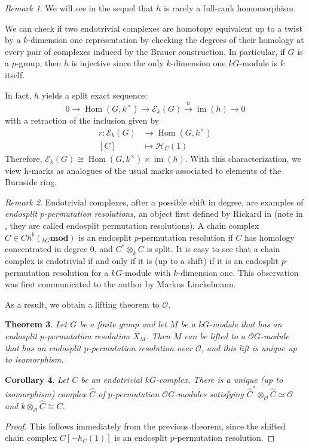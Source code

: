 \documentclass[10pt,letterpaper, boxed, cm]{amsart}
\newcommand{\Hom}{\operatorname{Hom}}
\newcommand{\bigO}{\mathcal{O}}
\newcommand{\calE}{\mathcal{E}}
\newcommand{\calH}{\mathcal{H}}
\newcommand{\calO}{\mathcal{O}}
\newtheorem{theorem}{Theorem}[section]
\newtheorem{corollary}[theorem]{Corollary}
\theoremstyle{remark}
\newtheorem{remark}[theorem]{Remark}
\theoremstyle{definition}
\begin{document}
	\begin{remark}
		We will see in the sequel that $h$ is rarely a full-rank homomorphism.

		We can check if two endotrivial complexes are homotopy equivalent up to a twist by a $k$-dimension one representation by checking the degrees of their homology at every pair of complexes induced by the Brauer construction. In particular, if $G$ is a $p$-group, then $h$ is injective since the only $k$-dimension one $kG$-module is $k$ itself.

		In fact, $h$ yields a split exact sequence:
		\[0 \to \Hom(G, k^\times) \to \calE_k(G) \xrightarrow{h} \operatorname{im}(h) \to 0\] with a retraction of the inclusion given by
		\begin{align*}
		r: \calE_k(G) & \to \Hom(G, k^\times)\\
		[C] &\mapsto \calH_C(1)
		\end{align*}
		Therefore, $\calE_k(G) \cong  \Hom(G, k^\times) \times \operatorname{im}(h)$. With this characterization, we view h-marks as analogues of the usual marks associated to elements of the Burnside ring.
	\end{remark}

    \begin{remark}
        Endotrivial complexes, after a possible shift in degree, are examples of \textit{endosplit $p$-permutation resolutions,} an object first defined by Rickard in \cite[Section 7]{R96} (note in \cite{R96}, they are called endosplit permutation resolutions). A chain complex $C \in Ch^b({}_{kG}\mathbf{mod})$ is an endosplit $p$-permutation resolution if $C$ has homology concentrated in degree 0, and $C^* \otimes_k C$ is split. It is easy to see that a chain complex is endotrivial if and only if it is (up to a shift) if it is an endosplit $p$-permutation resolution for a $kG$-module with $k$-dimension one. This observation was first communicated to the author by Markus Linckelmann.

        As a result, we obtain a lifting theorem to $\calO$.
    \end{remark}
    \begin{theorem}{\cite[Theorem 7.1]{R96}}
        Let $G$ be a finite group and let $M$ be a $kG$-module that has an endosplit $p$-permutation resolution $X_M$. Then $M$ can be lifted to a $\calO G$-module that has an endosplit $p$-permutation resolution over $\calO$, and this lift is unique up to isomorphism.
    \end{theorem}
    \begin{corollary}
        Let $C$ be an endotrivial $kG$-complex. There is a unique (up to isomorphism) complex $\widehat{C}$ of $p$-permutation $\calO G$-modules satisfying $\widehat{C}^* \otimes_\calO \widehat{C} \simeq \bigO$ and $k \otimes_\calO \widehat{C} \cong C$.
    \end{corollary}
    \begin{proof}
        This follows immediately from the previous theorem, since the shifted chain complex $C[-h_C(1)]$ is an endosplit $p$-permutation resolution.
    \end{proof}
\end{document}

